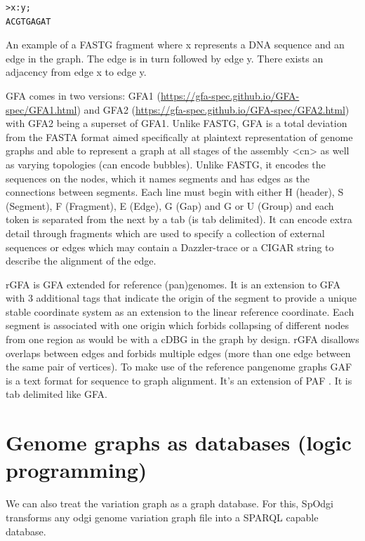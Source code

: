 \documentclass[11pt]{article}
\begin{document}
\begin{verbatim}
>x:y;
ACGTGAGAT
\end{verbatim}
An example of a FASTG fragment where x represents
a DNA sequence and an edge in the graph. The edge is in turn followed by edge y. 
There exists an adjacency from edge x to edge y.

GFA \cite{liMinimapMiniasmFast2016} comes in two versions:
GFA1 (\url{https://gfa-spec.github.io/GFA-spec/GFA1.html}) and
GFA2 (\url{https://gfa-spec.github.io/GFA-spec/GFA2.html}) with GFA2 being a superset
of GFA1. 
Unlike FASTG, GFA is a total deviation from the FASTA format aimed specifically 
at plaintext representation of genome graphs and able to represent a graph at 
all stages of the assembly <cn> as well as varying topologies (can encode bubbles).
Unlike FASTG, it encodes the sequences on the nodes, which it names segments and
has edges as the connections between segments. 
Each line must begin with either H (header), S (Segment), F (Fragment), E (Edge),
G (Gap) and G or U (Group) and each token is separated from the next by a tab
(is tab delimited). 
It can encode extra detail through fragments which are used to specify a
collection of external sequences or edges which may contain a Dazzler-trace or
a CIGAR string to describe the alignment of the edge.

rGFA \cite{liDesignConstructionReference2020} is GFA extended for reference 
(pan)genomes. It is an extension
to GFA with 3 additional tags that indicate the origin of the segment to
provide a unique stable coordinate system as an extension to the linear 
reference coordinate. Each segment is associated with one origin which forbids
collapsing of different nodes from one region as would be with a cDBG  in the
graph by design. rGFA disallows overlaps between edges and forbids multiple
edges (more than one edge between the same pair of vertices). 
To make use of the reference pangenome graphs 
GAF \cite{liDesignConstructionReference2020} is a text format 
for sequence to graph alignment.
It’s an extension of PAF \cite{liMinimapMiniasmFast2016}. 
It is tab delimited like GFA. 

\section{Genome graphs as databases (logic programming)}
\label{sec:orgf65da1b}
We can also treat the variation graph as a graph database. For this, SpOdgi 
 transforms any odgi genome variation graph file into a
SPARQL capable database.
\end{document}
